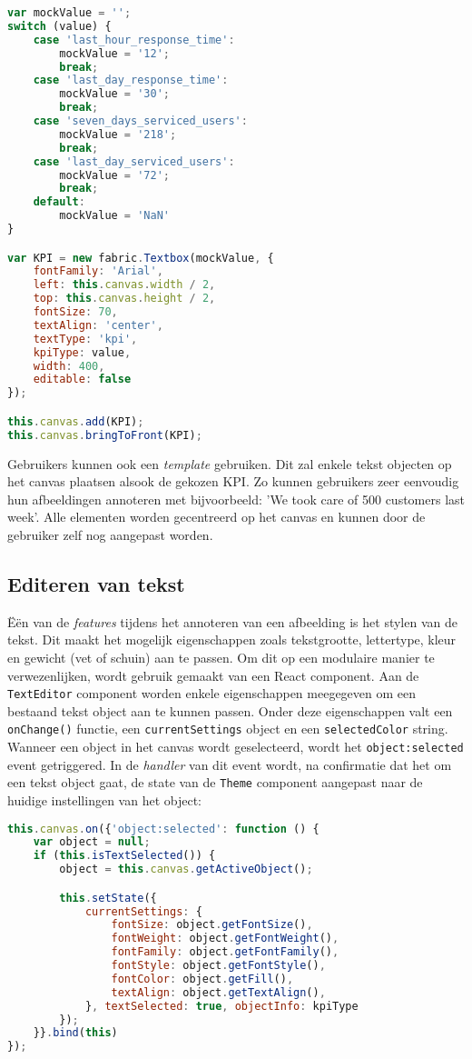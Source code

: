 \begin{lstlisting}[language=javascript]
var mockValue = '';
switch (value) {
	case 'last_hour_response_time':
		mockValue = '12';
		break;
	case 'last_day_response_time':
		mockValue = '30';
		break;
	case 'seven_days_serviced_users':
		mockValue = '218';
		break;
	case 'last_day_serviced_users':
		mockValue = '72';
		break;
	default:
		mockValue = 'NaN'
}

var KPI = new fabric.Textbox(mockValue, {
	fontFamily: 'Arial',
	left: this.canvas.width / 2,
	top: this.canvas.height / 2,
	fontSize: 70,
	textAlign: 'center',
	textType: 'kpi',
	kpiType: value,
	width: 400,
	editable: false
});

this.canvas.add(KPI);
this.canvas.bringToFront(KPI);
\end{lstlisting}

Gebruikers kunnen ook een \textit{template} gebruiken. Dit zal enkele tekst objecten op het canvas plaatsen alsook de gekozen KPI. Zo kunnen gebruikers zeer eenvoudig hun afbeeldingen annoteren met bijvoorbeeld: 'We took care of 500 customers last week'. Alle elementen worden gecentreerd op het canvas en kunnen door de gebruiker zelf nog aangepast worden. 

\subsection{Editeren van tekst}
\"{E}\"{e}n van de \textit{features} tijdens het annoteren van een afbeelding is het stylen van de tekst. Dit maakt het mogelijk eigenschappen zoals tekstgrootte, lettertype, kleur en gewicht (vet of schuin) aan te passen. Om dit op een modulaire manier te verwezenlijken, wordt gebruik gemaakt van een React component. Aan de \lstinline{TextEditor} component worden enkele eigenschappen meegegeven om een bestaand tekst object aan te kunnen passen. Onder deze eigenschappen valt een \lstinline{onChange()} functie, een \lstinline{currentSettings} object en een \lstinline{selectedColor} string. Wanneer een object in het canvas wordt geselecteerd, wordt het  \lstinline{object:selected} event getriggered. In de \textit{handler} van dit event wordt, na confirmatie dat het om een tekst object gaat, de state van de \lstinline{Theme} component aangepast naar de huidige instellingen van het object: 

\begin{lstlisting}[language=javascript]
this.canvas.on({'object:selected': function () {
	var object = null;
	if (this.isTextSelected()) {
		object = this.canvas.getActiveObject();

		this.setState({
			currentSettings: {
				fontSize: object.getFontSize(),
				fontWeight: object.getFontWeight(),
				fontFamily: object.getFontFamily(),
				fontStyle: object.getFontStyle(),
				fontColor: object.getFill(),
				textAlign: object.getTextAlign(),
			}, textSelected: true, objectInfo: kpiType
		});
	}}.bind(this)
});
\end{lstlisting}

